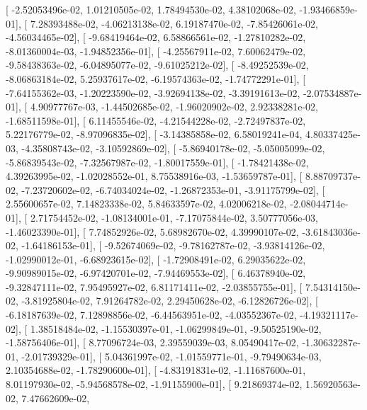 \documentclass{article}
\begin{document}
       [ -2.52053496e-02,   1.01210505e-02,   1.78494530e-02,
          4.38102068e-02,  -1.93466859e-01],
       [  7.28393488e-02,  -4.06213138e-02,   6.19187470e-02,
         -7.85426061e-02,  -4.56034465e-02],
       [ -9.68419464e-02,   6.58866561e-02,  -1.27810282e-02,
         -8.01360004e-03,  -1.94852356e-01],
       [ -4.25567911e-02,   7.60062479e-02,  -9.58438363e-02,
         -6.04895077e-02,  -9.61025212e-02],
       [ -8.49252539e-02,  -8.06863184e-02,   5.25937617e-02,
         -6.19574363e-02,  -1.74772291e-01],
       [ -7.64155362e-03,  -1.20223590e-02,  -3.92694138e-02,
         -3.39191613e-02,  -2.07534887e-01],
       [  4.90977767e-03,  -1.44502685e-02,  -1.96020902e-02,
          2.92338281e-02,  -1.68511598e-01],
       [  6.11455546e-02,  -4.21544228e-02,  -2.72497837e-02,
          5.22176779e-02,  -8.97096835e-02],
       [ -3.14385858e-02,   6.58019241e-04,   4.80337425e-03,
         -4.35808743e-02,  -3.10592869e-02],
       [ -5.86940178e-02,  -5.05005099e-02,  -5.86839543e-02,
         -7.32567987e-02,  -1.80017559e-01],
       [ -1.78421438e-02,   4.39263995e-02,  -1.02028552e-01,
          8.75538916e-03,  -1.53659787e-01],
       [  8.88709737e-02,  -7.23720602e-02,  -6.74034024e-02,
         -1.26872353e-01,  -3.91175799e-02],
       [  2.55600657e-02,   7.14823338e-02,   5.84633597e-02,
          4.02006218e-02,  -2.08044714e-01],
       [  2.71754452e-02,  -1.08134001e-01,  -7.17075844e-02,
          3.50777056e-03,  -1.46023390e-01],
       [  7.74852926e-02,   5.68982670e-02,   4.39990107e-02,
         -3.61843036e-02,  -1.64186153e-01],
       [ -9.52674069e-02,  -9.78162787e-02,  -3.93814126e-02,
         -1.02990012e-01,  -6.68923615e-02],
       [ -1.72908491e-02,   6.29035622e-02,  -9.90989015e-02,
         -6.97420701e-02,  -7.94469553e-02],
       [  6.46378940e-02,  -9.32847111e-02,   7.95495927e-02,
          6.81171411e-02,  -2.03855755e-01],
       [  7.54314150e-02,  -3.81925804e-02,   7.91264782e-02,
          2.29450628e-02,  -6.12826726e-02],
       [ -6.18187639e-02,   7.12898856e-02,  -6.44563951e-02,
         -4.03552367e-02,  -4.19321117e-02],
       [  1.38518484e-02,  -1.15530397e-01,  -1.06299849e-01,
         -9.50525190e-02,  -1.58756406e-01],
       [  8.77096724e-03,   2.39559039e-03,   8.05490417e-02,
         -1.30632287e-01,  -2.01739329e-01],
       [  5.04361997e-02,  -1.01559771e-01,  -9.79490634e-03,
          2.10354688e-02,  -1.78290600e-01],
       [ -4.83191831e-02,  -1.11687600e-01,   8.01197930e-02,
         -5.94568578e-02,  -1.91155900e-01],
       [  9.21869374e-02,   1.56920563e-02,   7.47662609e-02,
\end{document}
